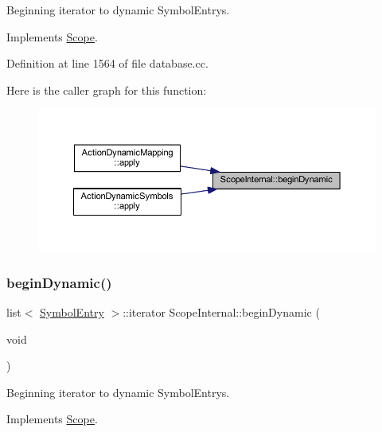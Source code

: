 Beginning iterator to dynamic Symbol\+Entrys. 



Implements \mbox{\hyperlink{class_scope_aab0f92c9d85a20b77b562e5a499b9e6d}{Scope}}.



Definition at line 1564 of file database.\+cc.

Here is the caller graph for this function\+:
\nopagebreak
\begin{figure}[H]
\begin{center}
\leavevmode
\includegraphics[width=350pt]{class_scope_internal_a3e1111265c90754ecafd2331f9c7a684_icgraph}
\end{center}
\end{figure}
\mbox{\label{class_scope_internal_afc5849bd91bd3eb1aa65900888317f98}} 
\subsubsection{\texorpdfstring{beginDynamic()}{beginDynamic()}\hspace{0.1cm}{\footnotesize\ttfamily [2/2]}}
{\footnotesize\ttfamily list$<$ \mbox{\hyperlink{class_symbol_entry}{Symbol\+Entry}} $>$\+::iterator Scope\+Internal\+::begin\+Dynamic (\begin{DoxyParamCaption}\item[{void}]{ }\end{DoxyParamCaption})\hspace{0.3cm}{\ttfamily [virtual]}}



Beginning iterator to dynamic Symbol\+Entrys. 



Implements \mbox{\hyperlink{class_scope_a883ad2607f2c7859b49b45100c2c0011}{Scope}}.



